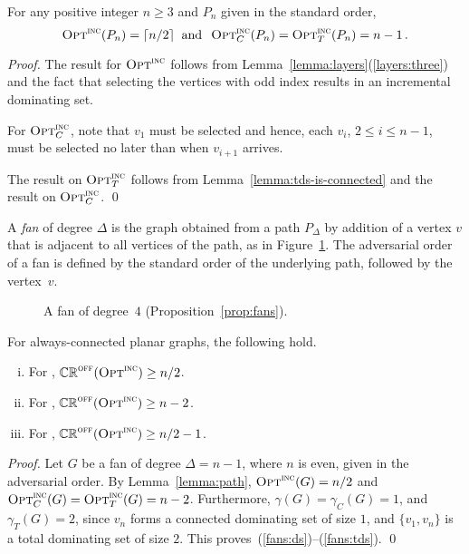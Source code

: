 \begin{lemma}
\label{lemma:path}
For any positive integer $n \ge 3$ and $P_n$ given in the standard order, 
$$\operatorname{\textsc{Opt}}^\textsc{\ensuremath{\text{inc}}}(P_n) = \lceil n/2 \rceil \: \text{ and } \: \operatorname{\textsc{Opt}}^\textsc{\ensuremath{\text{inc}}}_C(P_n) = \operatorname{\textsc{Opt}}^\textsc{\ensuremath{\text{inc}}}_T(P_n) =
n-1\,.$$
\end{lemma}
\begin{proof}
The result for $\operatorname{\textsc{Opt}}^\textsc{\ensuremath{\text{inc}}}$ follows from
Lemma~\ref{lemma:layers}(\ref{layers:three}) and
the fact that selecting the vertices with odd index results in an
incremental dominating set.

For $\operatorname{\textsc{Opt}}^\textsc{\ensuremath{\text{inc}}}_C$, note that $v_1$ must be selected and hence, each
$v_i$, $2 \leq i \leq n-1$, must be selected no later than when
$v_{i+1}$ arrives.

The result on $\operatorname{\textsc{Opt}}^\textsc{\ensuremath{\text{inc}}}_T$ follows from
Lemma~\ref{lemma:tds-is-connected} and the result on $\operatorname{\textsc{Opt}}^\textsc{\ensuremath{\text{inc}}}_C$. 
\qed\end{proof}

A \emph{fan} of degree $\Delta$ is the graph obtained from a path $P_{\Delta}$ 
by addition of a vertex $v$ that is adjacent to all
vertices of the path, as in Figure~\ref{fig:fan}. The adversarial 
order of a fan is defined by the standard order of the underlying path,
followed by the vertex~$v$.

\begin{figure}[!htb]
\begin{center}
\caption{A fan of degree~$4$ (Proposition~\ref{prop:fans}).
\label{fig:fan}}
\end{center}
\end{figure}

\begin{proposition}
\label{prop:fans}
For always-connected planar graphs, the following hold.
\begin{enumerate}[(i)]
\item \label{fans:ds} For \ds, $\mathbb{CR}^{\textsc{off}}(\operatorname{\textsc{Opt}}^\textsc{\ensuremath{\text{inc}}}) \ge n/2$.
\item \label{fans:cds} For \cds, $\mathbb{CR}^{\textsc{off}}(\operatorname{\textsc{Opt}}^\textsc{\ensuremath{\text{inc}}}) \ge n-2$.
\item \label{fans:tds} For \tds, $\mathbb{CR}^{\textsc{off}}(\operatorname{\textsc{Opt}}^\textsc{\ensuremath{\text{inc}}}) \ge n/2 -1$.
\end{enumerate}
\end{proposition}
\begin{proof}
Let $G$ be a fan of degree $\Delta=n-1$, where $n$ is even, given in the adversarial
order. By Lemma~\ref{lemma:path},
$\operatorname{\textsc{Opt}}^\textsc{\ensuremath{\text{inc}}}(G) = n/2$ and $\operatorname{\textsc{Opt}}^\textsc{\ensuremath{\text{inc}}}_C(G) = \operatorname{\textsc{Opt}}^\textsc{\ensuremath{\text{inc}}}_T(G) = n-2$.
Furthermore,
$\gamma(G) = \gamma_C(G) = 1$, and $\gamma_T(G) = 2$,
since $v_n$ forms a connected dominating set of size $1$, and 
$\{v_1,v_n\}$ is a total dominating set of size $2$.
This proves~(\ref{fans:ds})--(\ref{fans:tds}).
\qed\end{proof}

